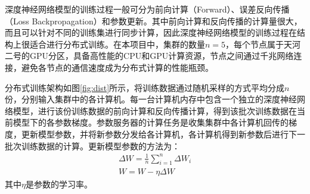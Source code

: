 深度神经网络模型的训练过程一般可分为前向计算（Forward）、误差反向传播（Loss Backpropagation）和参数更新。其中前向计算和反向传播的计算量很大，而且可以针对不同的训练集进行同步计算，因此深度神经网络模型的训练过程在结构上很适合进行分布式训练。在本项目中，集群的数量$n=5$，每个节点属于天河二号的GPU分区，具备高性能的CPU和GPU计算资源，节点之间通过千兆网络连接，避免各节点的通信速度成为分布式计算的性能瓶颈。

分布式训练架构如图\ref{fig:dist}所示，将训练数据通过随机采样的方式平均分成$n$份，分别输入集群中的各计算机。每一台计算机内存中包含一个独立的深度神经网络模型，进行该份训练数据的前向计算和反向传播计算，得到该批次训练数据在当前模型下的各参数梯度。参数服务器的计算任务是收集集群中各计算机回传的梯度，更新模型参数，并将新参数分发给各计算机，各计算机得到新参数后进行下一批次训练数据的计算。更新模型参数的方法为：
\begin{eqnarray}
\Delta W=\frac{1}{n}\sum_{i = 1}^{n}\Delta W_i \\
W=W-\eta\Delta W
\end{eqnarray}
其中$\eta$是参数的学习率。